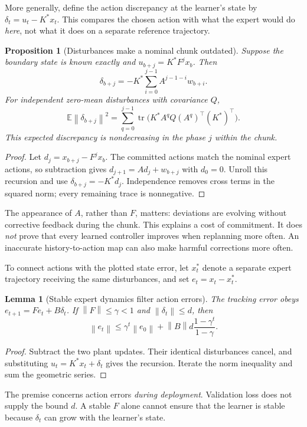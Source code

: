 \documentclass[12 pt]{article}        	%
\newcommand{\E}[0]{\mathbb{E}}
\newtheorem{lemma}[theorem]{Lemma}
\newtheorem{proposition}[theorem]{Proposition}
\theoremstyle{definition}
\newcommand{\norm}[1]{\left\|#1\right\|}
\DeclareMathOperator{\tr}{tr}
\begin{document}
More generally, define the action discrepancy at the learner's state by $\delta_t=u_t-K^*x_t$. This compares the chosen action with what the expert would do \emph{here}, not what it does on a separate reference trajectory.
\begin{proposition}[Disturbances make a nominal chunk outdated]
Suppose the boundary state is known exactly and $u_{b+j}=K^*F^jx_b$. Then
\[
\delta_{b+j}=-K^*\sum_{i=0}^{j-1}A^{j-1-i}w_{b+i}.
\]
For independent zero-mean disturbances with covariance $Q$,
\[
\E\norm{\delta_{b+j}}^2=
\sum_{q=0}^{j-1}\tr\bigl(K^*A^qQ(A^q)^\top(K^*)^\top\bigr).
\]
This expected discrepancy is nondecreasing in the phase $j$ within the chunk.
\end{proposition}
\begin{proof}
Let $d_j=x_{b+j}-F^jx_b$. The committed actions match the nominal expert actions, so subtraction gives $d_{j+1}=Ad_j+w_{b+j}$ with $d_0=0$. Unroll this recursion and use $\delta_{b+j}=-K^*d_j$. Independence removes cross terms in the squared norm; every remaining trace is nonnegative.
\end{proof}

The appearance of $A$, rather than $F$, matters: deviations are evolving without corrective feedback during the chunk. This explains a cost of commitment. It does \emph{not} prove that every learned controller improves when replanning more often. An inaccurate history-to-action map can also make harmful corrections more often.

To connect actions with the plotted state error, let $x_t^*$ denote a separate expert trajectory receiving the same disturbances, and set $e_t=x_t-x_t^*$.
\begin{lemma}[Stable expert dynamics filter action errors]
The tracking error obeys $e_{t+1}=Fe_t+B\delta_t$. If $\norm{F}\le\gamma<1$ and $\norm{\delta_t}\le d$, then
\[
\norm{e_t}\le\gamma^t\norm{e_0}+\norm{B}d\frac{1-\gamma^t}{1-\gamma}.
\]
\end{lemma}
\begin{proof}
Subtract the two plant updates. Their identical disturbances cancel, and substituting $u_t=K^*x_t+\delta_t$ gives the recursion. Iterate the norm inequality and sum the geometric series.
\end{proof}
The premise concerns action errors \emph{during deployment}. Validation loss does not supply the bound $d$. A stable $F$ alone cannot ensure that the learner is stable because $\delta_t$ can grow with the learner's state.
\end{document}
